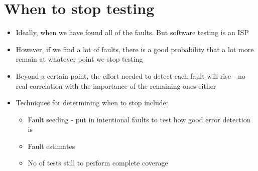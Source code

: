 \documentclass{article}[18pt]
\begin{document}
\section{When to stop testing}
\begin{itemize}
	\item Ideally, when we have found all of the faults. But software testing is an ISP
	\item However, if we find a lot of faults, there is a good probability that a lot more remain at whatever point we stop testing
	\item Beyond a certain point, the effort needed to detect each fault will rise - no real correlation with the importance of the remaining ones either
	\item Techniques for determining when to stop include:
	\begin{itemize}
		\item Fault seeding - put in intentional faults to test how good error detection is
		\item Fault estimates
		\item No of tests still to perform complete coverage
	\end{itemize}
\end{itemize}
\end{document}
